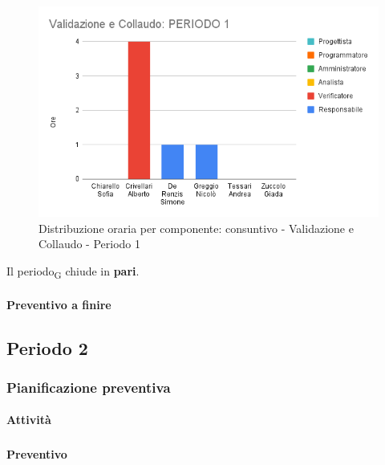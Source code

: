 \begin{figure}[H]
	\centering
	\includegraphics[scale=0.6]{res/images/charts/consuntivo/valid_1.png}
	\caption{Distribuzione oraria per componente: consuntivo - Validazione e Collaudo - Periodo 1}
\end{figure}


Il periodo\textsubscript{G} chiude in \textbf{pari}.


\paragraph{Preventivo a finire}
\subparagraph*{}

\pafTable{
	
}







\pagebreak
\subsection{Periodo 2}

\subsubsection{Pianificazione preventiva}

\paragraph{Attività}
\subparagraph*{}

\planningTable{
	
}

\paragraph{Preventivo}
\subparagraph*{}

